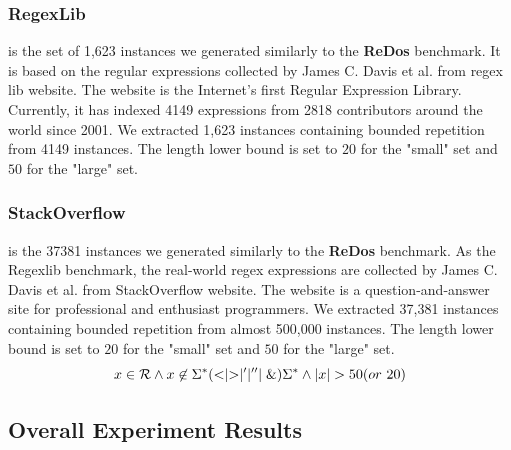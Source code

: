 {  \subsubsection{RegexLib} is the set of 1,623 instances we generated similarly to the \textbf{ReDos} benchmark. It is based on the regular expressions collected by James C. Davis et al.\cite{regex_lingua_franca} from regex lib website\cite{regexlib}. The website is the Internet's first Regular Expression Library. Currently, it has indexed 4149 expressions from 2818 contributors around the world since 2001. We extracted 1,623 instances containing bounded repetition from 4149 instances. The length lower bound is set to $20$ for the "small" set and $50$ for the "large" set.

  \subsubsection{StackOverflow} is the 37381 instances we generated similarly to the \textbf{ReDos} benchmark. As the Regexlib benchmark, the real-world regex expressions are collected by James C. Davis et al.\cite{regex_lingua_franca} from StackOverflow website\cite{stackoverflow}. The website is a question-and-answer site for professional and enthusiast programmers. We extracted 37,381 instances containing bounded repetition from almost 500,000 instances. The length lower bound is set to $20$ for the "small" set and $50$ for the "large" set.
  \begin{equation} \label{eq:template}
    x\in \mathcal{R} \wedge x\not\in \Sigma^*(<\mid >\mid '\mid ''\mid \&)\Sigma^*\wedge |x| > 50(or \ 20)
  \end{equation}
}

\vspace{-2mm}
\subsection{Overall Experiment Results}
\vspace{-1mm}

